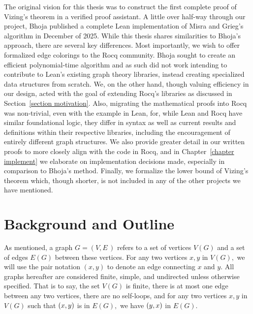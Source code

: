 The original vision for this thesis was to construct the first complete proof of Vizing's theorem in a verified proof assistant. A little over half-way through our project, Bhoja published a complete Lean implementation of Misra and Grieg's algorithm in December of 2025\cite{Bhoja}. While this thesis shares similarities to Bhoja's approach, there are several key differences. Most importantly, we wish to offer formalized edge colorings to the Rocq community. Bhoja sought to create an efficient polynomial-time algorithm and as such did not work intending to contribute to Lean's existing graph theory libraries, instead creating specialized data structures from scratch. We, on the other hand, though valuing efficiency in our design, acted with the goal of extending Rocq's libraries as discussed in Section~\ref{section motivation}. Also, migrating the mathematical proofs into Rocq was non-trivial, even with the example in Lean, for, while Lean and Rocq have similar foundational logic, they differ in syntax as well as current results and definitions within their respective libraries, including the encouragement of entirely different graph structures. We also provide greater detail in our written proofs to more closely align with the code in Rocq, and in Chapter~\ref{chapter implement} we elaborate on implementation decisions made, especially in comparison to Bhoja's method. Finally, we formalize the lower bound of Vizing's theorem which, though shorter, is not included in any of the other projects we have mentioned.

\section{Background and Outline}
As mentioned, a graph $G = (V, E\,)$ refers to a set of vertices $V(G)$ and a set of edges $E(G)$ between these vertices. For any two vertices $x, y$ in $V(G),$ we will use the pair notation $(x, y)$ to denote an edge connecting $x$ and $y.$ All graphs hereafter are considered finite, simple, and undirected unless otherwise specified. That is to say, the set $V(G)$ is finite, there is at most one edge between any two vertices, there are no self-loops, and for any two vertices $x, y$ in $V(G)$ such that $(x, y)$ is in $E(G),$ we have $(y, x)$ in $E(G).$

